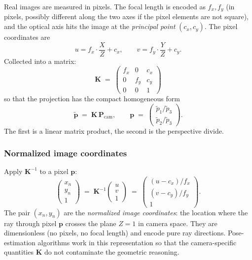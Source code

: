 \documentclass[11pt,a4paper]{article}
\theoremstyle{definition}
\theoremstyle{plain}
\theoremstyle{remark}
\newcommand{\Pcam}{\mathbf{P}_{\text{cam}}}
\newcommand{\KK}{\mathbf{K}}
\begin{document}
Real images are measured in pixels. The focal length is encoded as
$f_x, f_y$ (in pixels, possibly different along the two axes if the pixel
elements are not square), and the optical axis hits the image at the
\emph{principal point} $(c_x, c_y)$. The pixel coordinates are
\begin{equation}
  u = f_x \cdot \frac{X}{Z} + c_x, \qquad
  v = f_y \cdot \frac{Y}{Z} + c_y.
  \label{eq:pixel-projection}
\end{equation}
Collected into a matrix:
\begin{equation}
  \boxed{\quad
    \KK \;=\; \begin{pmatrix} f_x & 0 & c_x \\ 0 & f_y & c_y \\ 0 & 0 & 1 \end{pmatrix}
  \quad}
\end{equation}
so that the projection has the compact homogeneous form
\begin{equation}
  \tilde{\mathbf{p}} \;=\; \KK\,\Pcam,
  \qquad
  \mathbf{p} \;=\; \begin{pmatrix} \tilde p_1/\tilde p_3 \\ \tilde p_2/\tilde p_3 \end{pmatrix}.
\end{equation}
The first is a linear matrix product, the second is the perspective divide.

\subsubsection{Normalized image coordinates}

Apply $\KK^{-1}$ to a pixel $\mathbf{p}$:
\begin{equation}
  \begin{pmatrix} x_n \\ y_n \\ 1 \end{pmatrix}
  \;=\; \KK^{-1}
  \begin{pmatrix} u \\ v \\ 1 \end{pmatrix}
  \;=\;
  \begin{pmatrix} (u - c_x)/f_x \\ (v - c_y)/f_y \\ 1 \end{pmatrix}.
\end{equation}
The pair $(x_n, y_n)$ are the \emph{normalized image coordinates}: the
location where the ray through pixel $\mathbf{p}$ crosses the plane
$Z = 1$ in camera space. They are dimensionless (no pixels, no focal
length) and encode pure ray directions. Pose-estimation algorithms
work in this representation so that the camera-specific quantities $\KK$
do not contaminate the geometric reasoning.
\end{document}
